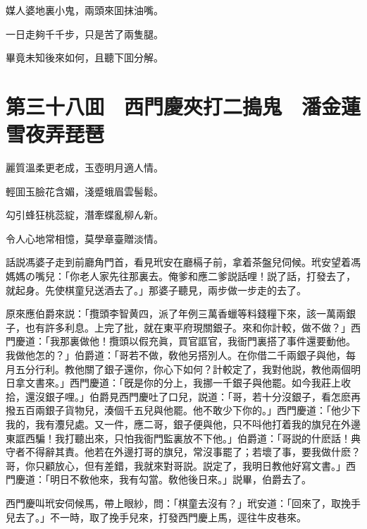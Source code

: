 媒人婆地裏小鬼，兩頭來囬抹油嘴。

一日走夠千千步，只是苦了兩隻腿。

畢竟未知後來如何，且聽下囬分解。

\chapter*{第三十八囬　西門慶夾打二搗鬼　潘金蓮雪夜弄琵琶}

麗質溫柔更老成，玉壺明月適人情。

輕囬玉臉花含媚，淺蹙蛾眉雲髻鬆。

勾引蜂狂桃蕊綻，潛牽蝶亂柳ん新。

令人心地常相憶，莫學章臺贈淡情。

話説馮婆子走到前廳角門首，看見玳安在廳槅子前，拿着茶盤兒伺候。玳安望着馮媽媽の嘴兒：「你老人家先往那裏去。俺爹和應二爹説話哩！説了話，打發去了，就起身。先使棋童兒送酒去了。」那婆子聽見，兩步做一步走的去了。

原來應伯爵來説：「攬頭李智黄四，派了年例三萬香蠟等料錢糧下來，該一萬兩銀子，也有許多利息。上完了批，就在東平府現關銀子。來和你計較，做不做？」西門慶道：「我那裏做他！攬頭以假充眞，買官誆官，我衙門裏搭了事件還要動他。我做他怎的？」伯爵道：「哥若不做，敎他另搭別人。在你借二千兩銀子與他，每月五分行利。教他關了銀子還你，你心下如何？計較定了，我對他説，教他兩個明日拿文書來。」西門慶道：「旣是你的分上，我挪一千銀子與他罷。如今我莊上收拾，還沒銀子哩。」伯爵見西門慶吐了口兒，説道：「哥，若十分沒銀子，看怎麽再撥五百兩銀子貨物兒，湊個千五兒與他罷。他不敢少下你的。」西門慶道：「他少下我的，我有灋兒處。又一件，應二哥，銀子便與他，只不呌他打着我的旗兒在外邊東誆西騙！我打聽出來，只怕我衙門監裏放不下他。」伯爵道：「哥説的什麽話！典守者不得辭其責。他若在外邊打哥的旗兒，常沒事罷了；若壞了事，要我做什麽？哥，你只顧放心，但有差錯，我就來對哥説。説定了，我明日教他好寫文書。」西門慶道：「明日不敎他來，我有勾當。敎他後日來。」説畢，伯爵去了。

西門慶叫玳安伺候馬，帶上眼紗，問：「棋童去沒有？」玳安道：「回來了，取挽手兒去了。」不一時，取了挽手兒來，打發西門慶上馬，逕往牛皮巷來。

